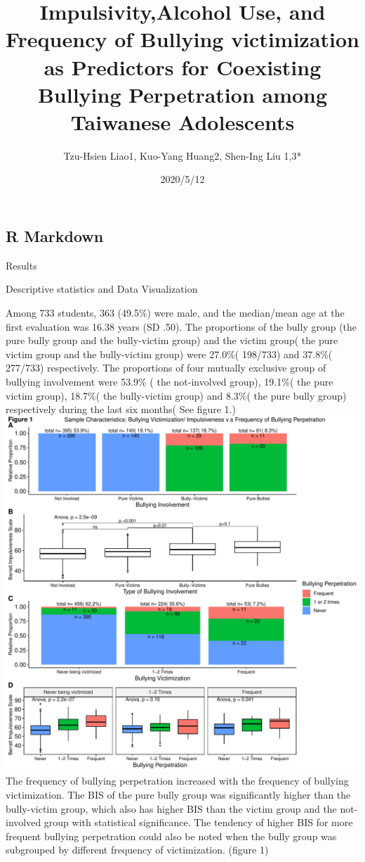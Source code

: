 \documentclass[
]{article}
\title{Impulsivity,Alcohol Use, and Frequency of Bullying victimization as
Predictors for Coexisting Bullying Perpetration among Taiwanese
Adolescents}
\author{Tzu-Hsien Liao1, Kuo-Yang Huang2, Shen-Ing Liu 1,3*}
\date{2020/5/12}
\begin{document}
\maketitle

\hypertarget{r-markdown}{%
\subsection{R Markdown}\label{r-markdown}}

Results

Descriptive statistics and Data Visualization

Among 733 students, 363 (49.5\%) were male, and the median/mean age at
the first evaluation was 16.38 years (SD .50). The proportions of the
bully group (the pure bully group and the bully-victim group) and the
victim group( the pure victim group and the bully-victim group) were
27.0\%( 198/733) and 37.8\%( 277/733) respectively. The proportions of
four mutually exclusive group of bullying involvement were 53.9\% ( the
not-involved group), 19.1\%( the pure victim group), 18.7\%( the
bully-victim group) and 8.3\%( the pure bully group) respectively during
the last six months( See figure 1.)
\includegraphics{Manuscript_files/figure-latex/Figure 1.-1.pdf} The
frequency of bullying perpetration increased with the frequency of
bullying victimization. The BIS of the pure bully group was
significantly higher than the bully-victim group, which also has higher
BIS than the victim group and the not-involved group with statistical
significance. The tendency of higher BIS for more frequent bullying
perpetration could also be noted when the bully group was subgrouped by
different frequency of victimization. (figure 1)
\end{document}
